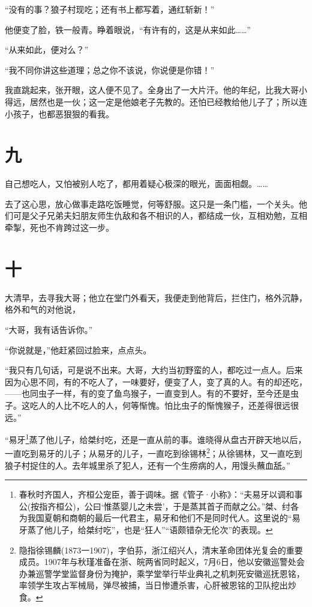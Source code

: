 \documentclass[12pt,UTF8]{ctexbook}
\begin{document}
“没有的事？狼子村现吃；还有书上都写着，通红斩新！”

他便变了脸，铁一般青。睁着眼说，“有许有的，这是从来如此……”

“从来如此，便对么？”

“我不同你讲这些道理；总之你不该说，你说便是你错！”

我直跳起来，张开眼，这人便不见了。全身出了一大片汗。他的年纪，比我大哥小得远，居然也是一伙；这一定是他娘老子先教的。还怕已经教给他儿子了；所以连小孩子，也都恶狠狠的看我。

\section{九}

自己想吃人，又怕被别人吃了，都用着疑心极深的眼光，面面相觑。……

去了这心思，放心做事走路吃饭睡觉，何等舒服。这只是一条门槛，一个关头。他们可是父子兄弟夫妇朋友师生仇敌和各不相识的人，都结成一伙，互相劝勉，互相牵掣，死也不肯跨过这一步。

\section{十}

大清早，去寻我大哥；他立在堂门外看天，我便走到他背后，拦住门，格外沉静，格外和气的对他说，

“大哥，我有话告诉你。”

“你说就是，”他赶紧回过脸来，点点头。

“我只有几句话，可是说不出来。大哥，大约当初野蛮的人，都吃过一点人。后来因为心思不同，有的不吃人了，一味要好，便变了人，变了真的人。有的却还吃，——也同虫子一样，有的变了鱼鸟猴子，一直变到人。有的不要好，至今还是虫子。这吃人的人比不吃人的人，何等惭愧。怕比虫子的惭愧猴子，还差得很远很远。”

“易牙\footnote{春秋时齐国人，齐桓公宠臣，善于调味。据《管子·小称》：“夫易牙以调和事公(按指齐桓公)，公曰‘惟蒸婴儿之未尝’，于是蒸其首子而献之公。”桀、纣各为我国夏朝和商朝的最后一代君主，易牙和他们不是同时代人。这里说的“易牙蒸了他儿子，给桀纣吃”，也是“狂人”“语颇错杂无伦次”的表现。}蒸了他儿子，给桀纣吃，还是一直从前的事。谁晓得从盘古开辟天地以后，一直吃到易牙的儿子；从易牙的儿子，一直吃到徐锡林\footnote{隐指徐锡麟(1873一1907)，字伯荪，浙江绍兴人，清末革命团体光复会的重要成员。1907年与秋瑾准备在浙、皖两省同时起义，7月6日，他以安徽巡警处会办兼巡警学堂监督身份为掩护，乘学堂举行毕业典礼之机刺死安徽巡抚恩铭，率领学生攻占军械局，弹尽被捕，当日惨遭杀害，心肝被恩铭的卫队挖出炒食。}；从徐锡林，又一直吃到狼子村捉住的人。去年城里杀了犯人，还有一个生痨病的人，用馒头蘸血舐。”
\end{document}
